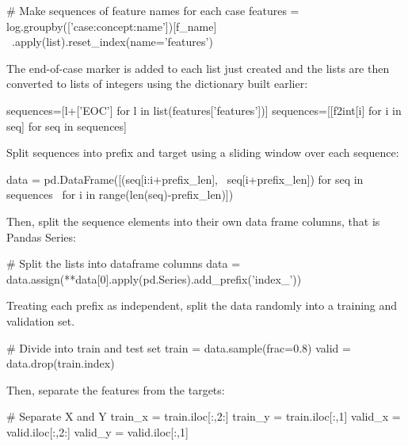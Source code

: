 \begin{samepage}
\begin{pythoncode}
# Make sequences of feature names for each case
features = log.groupby(['case:concept:name'])[f_name] \
    .apply(list).reset_index(name='features')
\end{pythoncode}
\end{samepage}

The end-of-case marker is added to each list just created and the lists are then converted to lists of integers using the dictionary built earlier:

\begin{samepage}
\begin{pythoncode}
sequences=[l+['EOC'] for l in list(features['features'])]
sequences=[[f2int[i] for i in seq] for seq in sequences]
\end{pythoncode}
\end{samepage}

Split sequences into prefix and target using a sliding window over each sequence:
\begin{samepage}
\begin{pythoncode}
data = pd.DataFrame([(seq[i:i+prefix_len], \
    seq[i+prefix_len]) for seq in sequences \
    for i in range(len(seq)-prefix_len)])
\end{pythoncode}
\end{samepage}

Then, split the sequence elements into their own data frame columns, that is Pandas Series:

\begin{samepage}
\begin{pythoncode}
# Split the lists into dataframe columns
data = data.assign(**data[0].apply(pd.Series).add_prefix('index_'))
\end{pythoncode}
\end{samepage}

Treating each prefix as independent, split the data randomly into a training and validation set. 

\begin{samepage}
\begin{pythoncode}
# Divide into train and test set
train = data.sample(frac=0.8)
valid = data.drop(train.index)
\end{pythoncode}
\end{samepage}

Then, separate the features from the targets:

\begin{samepage}
\begin{pythoncode}
# Separate X and Y
train_x = train.iloc[:,2:]
train_y = train.iloc[:,1]
valid_x = valid.iloc[:,2:]
valid_y = valid.iloc[:,1]
\end{pythoncode}
\end{samepage}

